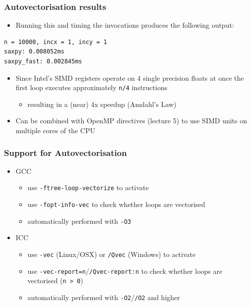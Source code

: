 \subsubsection{Autovectorisation
results}\label{autovectorisation-results}

\begin{itemize}
\itemsep1pt\parskip0pt
\item
  Running this and timing the invocations produces the following output:
\end{itemize}

\begin{verbatim}
n = 10000, incx = 1, incy = 1
saxpy: 0.008052ms
saxpy_fast: 0.002845ms
\end{verbatim}

\begin{itemize}
\itemsep1pt\parskip0pt
\item
  Since Intel's SIMD registers operate on 4 single precision floats at
  once the first loop executes approximately \texttt{n/4} instructions

  \begin{itemize}
  \itemsep1pt\parskip0pt
  \item
    resulting in a (near) 4x speedup (Amdahl's Law)
  \end{itemize}
\item
  Can be combined with OpenMP directives (lecture 5) to use SIMD units
  on multiple cores of the CPU
\end{itemize}

\subsubsection{Support for
Autovectorisation}\label{support-for-autovectorisation}

\begin{itemize}
\itemsep1pt\parskip0pt
\item
  GCC

  \begin{itemize}
  \itemsep1pt\parskip0pt
  \item
    use \texttt{-ftree-loop-vectorize} to activate
  \item
    use \texttt{-fopt-info-vec} to check whether loops are vectorised
  \item
    automatically performed with \texttt{-O3}
  \end{itemize}
\item
  ICC

  \begin{itemize}
  \itemsep1pt\parskip0pt
  \item
    use \texttt{-vec} (Linux/OSX) or \texttt{/Qvec} (Windows) to
    activate
  \item
    use \texttt{-vec-report=n}/\texttt{/Qvec-report:n} to check whether
    loops are vectorised (\texttt{n \textgreater{} 0})
  \item
    automatically performed with \texttt{-O2}/\texttt{/O2} and higher
  \end{itemize}
\end{itemize}

